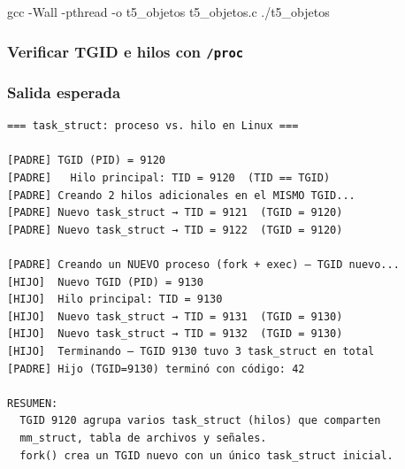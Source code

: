 \documentclass[
  spanish,
]{article}
\newenvironment{Shaded}{}{}
\newcommand{\AttributeTok}[1]{\textcolor[rgb]{0.49,0.56,0.16}{#1}}
\newcommand{\ExtensionTok}[1]{#1}
\newcommand{\FunctionTok}[1]{\textcolor[rgb]{0.02,0.16,0.49}{#1}}
\newcommand{\KeywordTok}[1]{\textcolor[rgb]{0.00,0.44,0.13}{\textbf{#1}}}
\newcommand{\NormalTok}[1]{#1}
\newcommand{\OperatorTok}[1]{\textcolor[rgb]{0.40,0.40,0.40}{#1}}
\newcommand{\StringTok}[1]{\textcolor[rgb]{0.25,0.44,0.63}{#1}}
\newcommand{\VariableTok}[1]{\textcolor[rgb]{0.10,0.09,0.49}{#1}}
\begin{document}
\begin{Shaded}
\begin{Highlighting}[]
\FunctionTok{gcc} \AttributeTok{{-}Wall} \AttributeTok{{-}pthread} \AttributeTok{{-}o}\NormalTok{ t5\_objetos t5\_objetos.c}
\ExtensionTok{./t5\_objetos}
\end{Highlighting}
\end{Shaded}

\subsubsection{\texorpdfstring{Verificar TGID e hilos con
\texttt{/proc}}{Verificar TGID e hilos con /proc}}\label{verificar-tgid-e-hilos-con-proc}

\begin{Shaded}
\end{Shaded}

\subsubsection{Salida esperada}\label{salida-esperada-4}

\begin{verbatim}
=== task_struct: proceso vs. hilo en Linux ===

[PADRE] TGID (PID) = 9120
[PADRE]   Hilo principal: TID = 9120  (TID == TGID)
[PADRE] Creando 2 hilos adicionales en el MISMO TGID...
[PADRE] Nuevo task_struct → TID = 9121  (TGID = 9120)
[PADRE] Nuevo task_struct → TID = 9122  (TGID = 9120)

[PADRE] Creando un NUEVO proceso (fork + exec) — TGID nuevo...
[HIJO]  Nuevo TGID (PID) = 9130
[HIJO]  Hilo principal: TID = 9130
[HIJO]  Nuevo task_struct → TID = 9131  (TGID = 9130)
[HIJO]  Nuevo task_struct → TID = 9132  (TGID = 9130)
[HIJO]  Terminando — TGID 9130 tuvo 3 task_struct en total
[PADRE] Hijo (TGID=9130) terminó con código: 42

RESUMEN:
  TGID 9120 agrupa varios task_struct (hilos) que comparten
  mm_struct, tabla de archivos y señales.
  fork() crea un TGID nuevo con un único task_struct inicial.
\end{verbatim}
\end{document}

